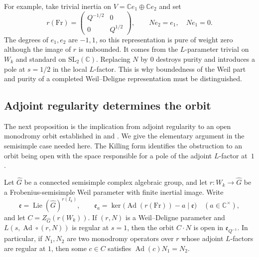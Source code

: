 For example, take trivial inertia on $V=\mathbb C e_1\oplus
\mathbb C e_2$ and set
\[
 r(\mathrm{Fr})=
 \begin{pmatrix}Q^{-1/2}&0\\0&Q^{1/2}\end{pmatrix},
 \qquad
 Ne_2=e_1,\quad Ne_1=0.
\]
The degrees of $e_1,e_2$ are $-1,1$, so this representation is pure
of weight zero although the image of $r$ is unbounded.  It comes
from the $L$-parameter trivial on $W_k$ and standard on
$\mathrm{SL}_2(\mathbb C)$.  Replacing $N$ by $0$ destroys purity
and introduces a pole at $s=1/2$ in the local $L$-factor.  This is
why boundedness of the Weil part and purity of a completed
Weil--Deligne representation must be distinguished.

\subsection{Adjoint regularity determines the orbit}

The next proposition is the implication from adjoint regularity to an
open monodromy orbit established in
\cite[Proposition~3.5]{CDFZ2025} and
\cite[Proposition~6.10]{DHKM2026}.  We give the elementary argument in
the semisimple case needed here.  The Killing form identifies the
obstruction to an orbit being open with the space responsible for a
pole of the adjoint $L$-factor at~$1$.

\begin{proposition}\label{prop:open-orbit}
Let $\widehat G$ be a connected semisimple complex algebraic group,
and let $r:W_k\to\widehat G$ be a Frobenius-semisimple Weil
parameter with finite inertial image.  Write
\[
 \mathfrak e=\operatorname{Lie}(\widehat G)^{r(I_k)},
 \qquad
 \mathfrak e_a=
 \ker\bigl(\operatorname{Ad}(r(\mathrm{Fr}))-a
                 \mid\mathfrak e\bigr)
 \quad(a\in\mathbb C^\times),
\]
and let $C=Z_{\widehat G}(r(W_k))$.  If $(r,N)$ is a
Weil--Deligne parameter and $L(s,\operatorname{Ad}\circ(r,N))$
is regular at $s=1$, then the orbit $C\cdot N$ is open in
$\mathfrak e_{Q^{-1}}$.
In particular, if $N_1,N_2$ are two monodromy operators over $r$
whose adjoint $L$-factors are regular at $1$, then some $c\in C$
satisfies $\operatorname{Ad}(c)N_1=N_2$.
\end{proposition}

